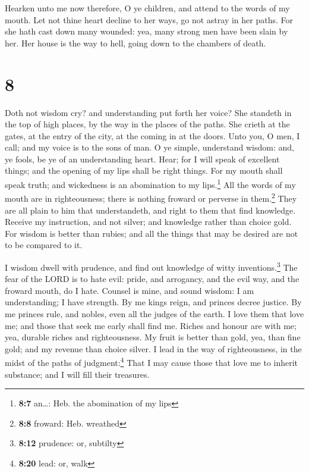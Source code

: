  Hearken unto me now therefore, O ye children, and attend
to the words of my mouth.  Let not thine heart decline to
her ways, go not astray in her paths.  For she hath cast
down many wounded: yea, many strong men have been slain by her.
 Her house is the way to hell, going down to the chambers
of death.

\hypertarget{section-7}{%
\section{8}\label{section-7}}

 Doth not wisdom cry? and understanding put forth her
voice?  She standeth in the top of high places, by the way
in the places of the paths.  She crieth at the gates, at
the entry of the city, at the coming in at the doors. 
Unto you, O men, I call; and my voice is to the sons of man.
 O ye simple, understand wisdom: and, ye fools, be ye of
an understanding heart.  Hear; for I will speak of
excellent things; and the opening of my lips shall be right things.
 For my mouth shall speak truth; and wickedness is an
abomination to my lips.\footnote{\textbf{8:7} an\ldots: Heb. the
  abomination of my lips}  All the words of my mouth are
in righteousness; there is nothing froward or perverse in
them.\footnote{\textbf{8:8} froward: Heb. wreathed}  They
are all plain to him that understandeth, and right to them that find
knowledge.  Receive my instruction, and not silver; and
knowledge rather than choice gold.  For wisdom is better
than rubies; and all the things that may be desired are not to be
compared to it.

 I wisdom dwell with prudence, and find out knowledge of
witty inventions.\footnote{\textbf{8:12} prudence: or, subtilty}
 The fear of the LORD is to hate evil: pride, and
arrogancy, and the evil way, and the froward mouth, do I hate.
 Counsel is mine, and sound wisdom: I am understanding; I
have strength.  By me kings reign, and princes decree
justice.  By me princes rule, and nobles, even all the
judges of the earth.  I love them that love me; and those
that seek me early shall find me.  Riches and honour are
with me; yea, durable riches and righteousness.  My fruit
is better than gold, yea, than fine gold; and my revenue than choice
silver.  I lead in the way of righteousness, in the midst
of the paths of judgment:\footnote{\textbf{8:20} lead: or, walk}
 That I may cause those that love me to inherit
substance; and I will fill their treasures.

